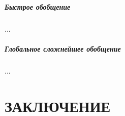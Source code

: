 \documentclass[12pt]{article}
\begin{document}
\subsubsection[Быстрое обобщение]{\large Быстрое обобщение}
\hspace{\parindent} ...
\subsubsection[Глобальное сложнейшее обобщение]{\large Глобальное сложнейшее обобщение}
\hspace{\parindent} ...

\clearpage
\newpage

\part*{\large \centering ЗАКЛЮЧЕНИЕ}
\hspace{\parindent}

\clearpage
\newpage
\begin{flushleft}
\end{flushleft}
\end{document}
